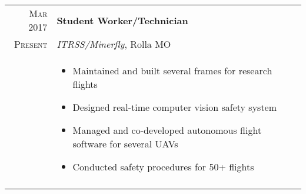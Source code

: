 \documentclass[a4paper,10pt]{article}
\newcommand{\br}{\\\multicolumn{2}{c}{}}
\begin{document}
\begin{tabular}{r|p{15cm}}
    \textsc{Mar 2017} & \textbf{Student Worker/Technician} \\
    \textsc{Present}         & \textit{ITRSS/Minerfly}, Rolla MO \\ &
    \begin{itemize}
    \item Maintained and built several frames for research flights
    \item Designed real-time computer vision safety system
    \item Managed and co-developed autonomous flight software for several UAVs
    \item Conducted safety procedures for 50+ flights

    \end{itemize} \br\\

\end{tabular}
\end{document}
